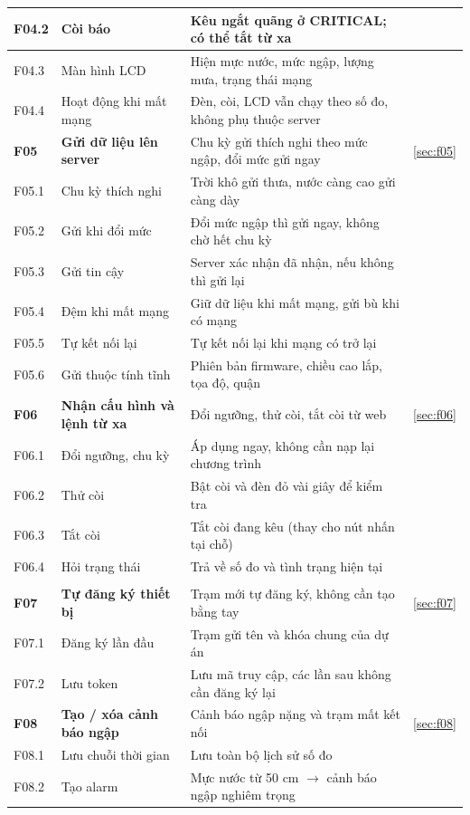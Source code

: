 \documentclass[12pt,a4paper]{article}
\newcommand{\fc}[1]{\textbf{\color{brand}#1}}
\newcommand{\grp}[1]{\rowcolor{grpA}\multicolumn{4}{l}{\textbf{#1}}\\}
\begin{document}
\begin{longtable}{|C{1.25cm}|L{4.1cm}|L{7.6cm}|C{1.1cm}|}
F04.2 & Còi báo & Kêu ngắt quãng ở CRITICAL; có thể tắt từ xa & \\ \hline
F04.3 & Màn hình LCD & Hiện mực nước, mức ngập, lượng mưa, trạng thái mạng & \\ \hline
F04.4 & Hoạt động khi mất mạng & Đèn, còi, LCD vẫn chạy theo số đo, không phụ thuộc server & \\ \hline
\fc{F05} & \textbf{Gửi dữ liệu lên server} & Chu kỳ gửi thích nghi theo mức ngập, đổi mức gửi ngay & \ref{sec:f05} \\ \hline
F05.1 & Chu kỳ thích nghi & Trời khô gửi thưa, nước càng cao gửi càng dày & \\ \hline
F05.2 & Gửi khi đổi mức & Đổi mức ngập thì gửi ngay, không chờ hết chu kỳ & \\ \hline
F05.3 & Gửi tin cậy & Server xác nhận đã nhận, nếu không thì gửi lại & \\ \hline
F05.4 & Đệm khi mất mạng & Giữ dữ liệu khi mất mạng, gửi bù khi có mạng & \\ \hline
F05.5 & Tự kết nối lại & Tự kết nối lại khi mạng có trở lại & \\ \hline
F05.6 & Gửi thuộc tính tĩnh & Phiên bản firmware, chiều cao lắp, tọa độ, quận & \\ \hline
\fc{F06} & \textbf{Nhận cấu hình và lệnh từ xa} & Đổi ngưỡng, thử còi, tắt còi từ web & \ref{sec:f06} \\ \hline
F06.1 & Đổi ngưỡng, chu kỳ & Áp dụng ngay, không cần nạp lại chương trình & \\ \hline
F06.2 & Thử còi & Bật còi và đèn đỏ vài giây để kiểm tra & \\ \hline
F06.3 & Tắt còi & Tắt còi đang kêu (thay cho nút nhấn tại chỗ) & \\ \hline
F06.4 & Hỏi trạng thái & Trả về số đo và tình trạng hiện tại & \\ \hline
\grp{B. Nền tảng ThingsBoard} \hline
\fc{F07} & \textbf{Tự đăng ký thiết bị} & Trạm mới tự đăng ký, không cần tạo bằng tay & \ref{sec:f07} \\ \hline
F07.1 & Đăng ký lần đầu & Trạm gửi tên và khóa chung của dự án & \\ \hline
F07.2 & Lưu token & Lưu mã truy cập, các lần sau không cần đăng ký lại & \\ \hline
\fc{F08} & \textbf{Tạo / xóa cảnh báo ngập} & Cảnh báo ngập nặng và trạm mất kết nối & \ref{sec:f08} \\ \hline
F08.1 & Lưu chuỗi thời gian & Lưu toàn bộ lịch sử số đo & \\ \hline
F08.2 & Tạo alarm & Mực nước từ 50 cm $\rightarrow$ cảnh báo ngập nghiêm trọng & \\ \hline

\end{longtable}
\end{document}
